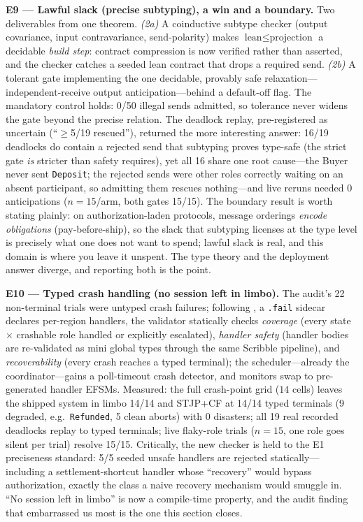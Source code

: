 \documentclass{article}
\newcommand{\stjp}{\textsc{STJP}}
\begin{document}
\textbf{E9 --- Lawful slack (precise subtyping), a win and a boundary.} Two deliverables from one theorem. \emph{(2a)} A coinductive subtype checker (output covariance, input contravariance, send-polarity) makes $\text{lean} \leq \text{projection}$ a decidable \emph{build step}: contract compression is now verified rather than asserted, and the checker catches a seeded lean contract that drops a required send. \emph{(2b)} A tolerant gate implementing the one decidable, provably safe relaxation---independent-receive output anticipation---behind a default-off flag. The mandatory control holds: 0/50 illegal sends admitted, so tolerance never widens the gate beyond the precise relation. The deadlock replay, pre-registered as uncertain (``$\geq$5/19 rescued''), returned the more interesting answer: 16/19 deadlocks do contain a rejected send that subtyping proves type-safe (the strict gate \emph{is} stricter than safety requires), yet all 16 share one root cause---the Buyer never sent \texttt{Deposit}; the rejected sends were other roles correctly waiting on an absent participant, so admitting them rescues nothing---and live reruns needed 0 anticipations ($n{=}15$/arm, both gates 15/15). The boundary result is worth stating plainly: on authorization-laden protocols, message orderings \emph{encode obligations} (pay-before-ship), so the slack that subtyping licenses at the type level is precisely what one does not want to spend; lawful slack is real, and this domain is where you leave it unspent. The type theory and the deployment answer diverge, and reporting both is the point.

\textbf{E10 --- Typed crash handling (no session left in limbo).} The audit's 22 non-terminal trials were untyped crash failures; following \citet{viering18}, a \texttt{.fail} sidecar declares per-region handlers, the validator statically checks \emph{coverage} (every state $\times$ crashable role handled or explicitly escalated), \emph{handler safety} (handler bodies are re-validated as mini global types through the same Scribble pipeline), and \emph{recoverability} (every crash reaches a typed terminal); the scheduler---already the coordinator---gains a poll-timeout crash detector, and monitors swap to pre-generated handler EFSMs. Measured: the full crash-point grid ($14$ cells) leaves the shipped system in limbo 14/14 and \stjp{}+CF at 14/14 typed terminals (9 degraded, e.g.\ \texttt{Refunded}, 5 clean aborts) with 0 disasters; all 19 real recorded deadlocks replay to typed terminals; live flaky-role trials ($n{=}15$, one role goes silent per trial) resolve 15/15. Critically, the new checker is held to the E1 preciseness standard: 5/5 seeded unsafe handlers are rejected statically---including a settlement-shortcut handler whose ``recovery'' would bypass authorization, exactly the class a naive recovery mechanism would smuggle in. ``No session left in limbo'' is now a compile-time property, and the audit finding that embarrassed us most is the one this section closes.
\end{document}
